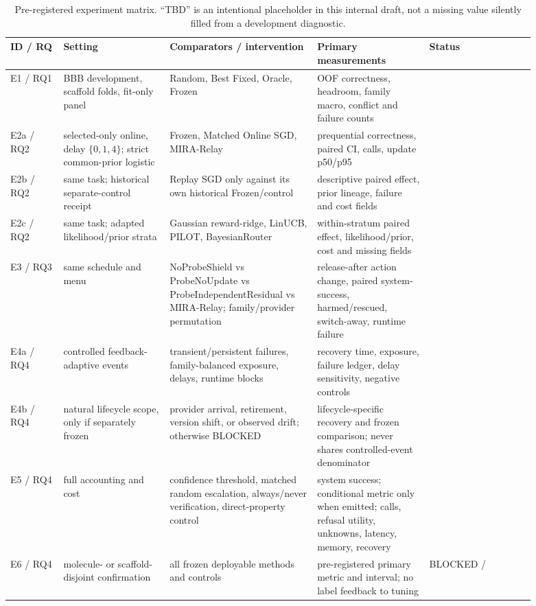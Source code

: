 \documentclass[sigconf,anonymous]{aamas}
\newcommand{\tbd}{\text{TBD}}
\begin{document}
\begin{table}[t]
\caption{Pre-registered experiment matrix. ``TBD'' is an intentional placeholder in this internal draft, not a missing value silently filled from a development diagnostic.}
\label{tab:matrix}
\small
\begin{tabular}{p{0.09\linewidth}p{0.18\linewidth}p{0.25\linewidth}p{0.19\linewidth}p{0.18\linewidth}}
\toprule
ID / RQ & Setting & Comparators / intervention & Primary measurements & Status \\
\midrule
E1 / RQ1 & BBB development, scaffold folds, fit-only panel & Random, Best Fixed, Oracle, Frozen & OOF correctness, headroom, family macro, conflict and failure counts & \tbd{} \\
E2a / RQ2 & selected-only online, delay $\{0,1,4\}$; strict common-prior logistic & Frozen, Matched Online SGD, MIRA-Relay & prequential correctness, paired CI, calls, update p50/p95 & \tbd{} \\
E2b / RQ2 & same task; historical separate-control receipt & Replay SGD only against its own historical Frozen/control & descriptive paired effect, prior lineage, failure and cost fields & \tbd{} \\
E2c / RQ2 & same task; adapted likelihood/prior strata & Gaussian reward-ridge, LinUCB, PILOT, BayesianRouter & within-stratum paired effect, likelihood/prior, cost and missing fields & \tbd{} \\
E3 / RQ3 & same schedule and menu & NoProbeShield vs ProbeNoUpdate vs ProbeIndependentResidual vs MIRA-Relay; family/provider permutation & release-after action change, paired system-success, harmed/rescued, switch-away, runtime failure & \tbd{} \\
E4a / RQ4 & controlled feedback-adaptive events & transient/persistent failures, family-balanced exposure, delays, runtime blocks & recovery time, exposure, failure ledger, delay sensitivity, negative controls & \tbd{} \\
E4b / RQ4 & natural lifecycle scope, only if separately frozen & provider arrival, retirement, version shift, or observed drift; otherwise BLOCKED & lifecycle-specific recovery and frozen comparison; never shares controlled-event denominator & \tbd{} \\
E5 / RQ4 & full accounting and cost & confidence threshold, matched random escalation, always/never verification, direct-property control & system success; conditional metric only when emitted; calls, refusal utility, unknowns, latency, memory, recovery & \tbd{} \\
E6 / RQ4 & molecule- or scaffold-disjoint confirmation & all frozen deployable methods and controls & pre-registered primary metric and interval; no label feedback to tuning & BLOCKED / \tbd{} \\
\bottomrule
\end{tabular}
\end{table}
\end{document}
